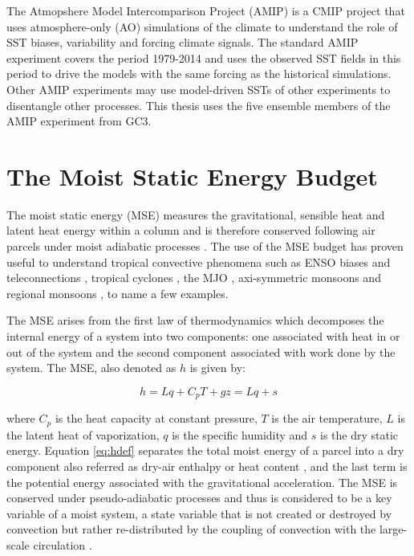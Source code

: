 The Atmopshere Model Intercomparison Project (AMIP) is a CMIP project that uses atmosphere-only (AO) simulations of the climate to understand the role of SST biases, variability and forcing climate signals. The standard AMIP experiment covers the period 1979-2014 and uses the observed SST fields in this period to drive the models with the same forcing as the historical simulations. Other AMIP experiments may use model-driven SSTs of other experiments to disentangle other processes.  This thesis uses the five ensemble members of the AMIP experiment from GC3. 

\section{The Moist Static Energy Budget}\label{sq:msemethod}

The moist static energy (MSE) measures the gravitational, sensible heat and latent heat energy within a column and is therefore conserved following air parcels under moist adiabatic processes \citep{neelin2005,back2006,ma2019}. The use of the MSE budget has proven useful to understand tropical convective phenomena such as ENSO biases \citep{annamalai2020} and teleconnections \citep{neelin2005}, tropical cyclones \citep[e.g.][]{wing2019}, the MJO \citep{inoue2015}, axi-symmetric monsoons \citep[e.g.][]{bordoni2008monsoons} and regional monsoons \citep[e.g.][]{smyth2018simulated,ma2019}, to name a few examples. 

The MSE arises from the first law of thermodynamics which decomposes the internal energy of a system into two components: one associated with heat in or out of the system and the second component associated with work done by the system. 
The MSE, also denoted as $h$ is given by:

\begin{equation}
h=Lq+C_pT+gz=Lq+s
\label{eq:hdef}
\end{equation}

\noindent where $C_p$ is the heat capacity at constant pressure, $T$ is the air temperature, $L$ is the latent heat of vaporization, $q$ is the specific humidity and $s$ is the dry static energy. 
Equation \ref{eq:hdef} separates the total moist energy of a parcel into a dry component also referred as dry-air enthalpy or heat content \citep{emanuel2007quasi}, and the last term is the potential energy associated with the gravitational acceleration. 
The MSE is conserved under pseudo-adiabatic processes and thus is considered to be a key variable of a moist system, a state variable that is not created or destroyed by convection but rather re-distributed by the coupling of convection with the large-scale circulation \citep{chou2004,emanuel2007quasi}.

